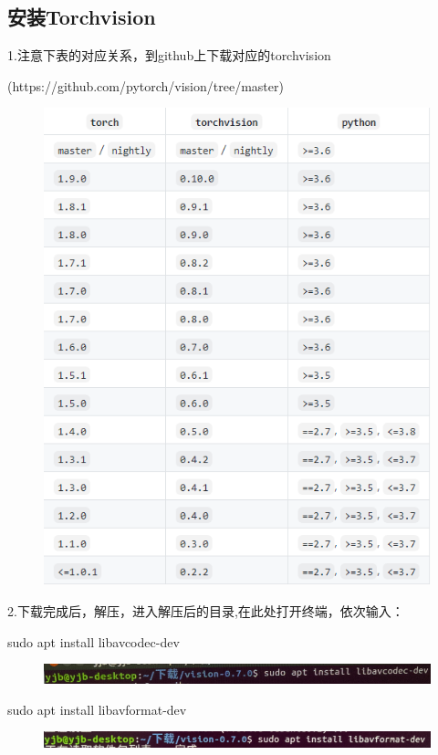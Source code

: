 \documentclass[openbib]{article}
\begin{document}
\subsection{安装Torchvision}
1.注意下表的对应关系，到github上下载对应的torchvision

(https://github.com/pytorch/vision/tree/master)
\begin{figure}[H]
	\centering
	\includegraphics[scale=0.3]{torch}
\end{figure}

2.下载完成后，解压，进入解压后的目录,在此处打开终端，依次输入：

sudo apt install libavcodec-dev
\begin{figure}[H]
	\centering
	\includegraphics[scale=0.3]{d7}
\end{figure}

sudo apt install libavformat-dev

\begin{figure}[H]
	\centering
	\includegraphics[scale=0.3]{d8}
\end{figure}
\end{document}
